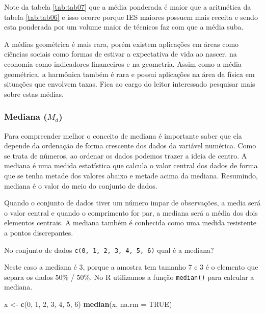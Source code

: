 \documentclass[12pt,]{style/krantz}
\makeatletter
\newenvironment{Shaded}{\begin{snugshade}}{\end{snugshade}}
\newcommand{\KeywordTok}[1]{\textcolor[rgb]{0.13,0.29,0.53}{\textbf{#1}}}
\newcommand{\DataTypeTok}[1]{\textcolor[rgb]{0.13,0.29,0.53}{#1}}
\newcommand{\DecValTok}[1]{\textcolor[rgb]{0.00,0.00,0.81}{#1}}
\newcommand{\StringTok}[1]{\textcolor[rgb]{0.31,0.60,0.02}{#1}}
\newcommand{\OtherTok}[1]{\textcolor[rgb]{0.56,0.35,0.01}{#1}}
\newcommand{\NormalTok}[1]{#1}
\renewenvironment{quote}{\begin{VF}}{\end{VF}}
\newenvironment{kframe}{%
\medskip{}
\setlength{\fboxsep}{.8em}
 \def\at@end@of@kframe{}%
 \ifinner\ifhmode%
  \def\at@end@of@kframe{\end{minipage}}%
  \begin{minipage}{\columnwidth}%
 \fi\fi%
 \def\FrameCommand##1{\hskip\@totalleftmargin \hskip-\fboxsep
 \colorbox{shadecolor}{##1}\hskip-\fboxsep
     \hskip-\linewidth \hskip-\@totalleftmargin \hskip\columnwidth}%
 \MakeFramed {\advance\hsize-\width
   \@totalleftmargin\z@ \linewidth\hsize
   \@setminipage}}%
 {\par\unskip\endMakeFramed%
 \at@end@of@kframe}
\renewenvironment{Shaded}{\begin{kframe}}{\end{kframe}}
\theoremstyle{definition}
\theoremstyle{definition}
\theoremstyle{definition}
\theoremstyle{remark}
\let\BeginKnitrBlock\begin \let\EndKnitrBlock\end
\makeatother
\begin{document}
Note da tabela \ref{tab:tab07} que a média ponderada é maior que a
aritmética da tabela \ref{tab:tab06} e isso ocorre porque IES maiores
possuem mais receita e sendo esta ponderada por um volume maior de
técnicos faz com que a média suba.

A médias geométrica é mais rara, porém existem aplicações em áreas como
ciências sociais como formas de estivar a expectativa de vida ao nascer,
na economia como indicadores financeiros e na geometria. Assim como a
média geométrica, a harmônica também é rara e possui aplicações na área
da física em situações que envolvem taxas. Fica ao cargo do leitor
interessado pesquisar mais sobre estas médias.

\subsubsection{\texorpdfstring{Mediana
(\(M_d\))}{Mediana (M\_d)}}\label{mediana-m_d}

Para compreender melhor o conceito de mediana é importante saber que ela
depende da ordenação de forma crescente dos dados da variável numérica.
Como se trata de números, ao ordenar os dados podemos trazer a ideia de
centro. A mediana é uma medida estatística que calcula o valor central
dos dados de forma que se tenha metade dos valores abaixo e metade acima
da mediana. Resumindo, mediana é o valor do meio do conjunto de dados.

\begin{quote}
Quando o conjunto de dados tiver um número impar de observações, a media
será o valor central e quando o comprimento for par, a mediana será a
média dos dois elementos centrais. A mediana também é conhecida como uma
medida resistente a pontos discrepantes.
\end{quote}

\BeginKnitrBlock{example}
\protect\hypertarget{exm:unnamed-chunk-52}{}{\label{exm:unnamed-chunk-52}
}No conjunto de dados \texttt{c(0,\ 1,\ 2,\ 3,\ 4,\ 5,\ 6)} qual é a
mediana?
\EndKnitrBlock{example}

Neste caso a mediana é 3, porque a amostra tem tamanho 7 e 3 é o
elemento que separa os dados 50\% / 50\%. No R utilizamos a função
\texttt{median()} para calcular a mediana.

\begin{Shaded}
\begin{Highlighting}[]
\NormalTok{x <-}\StringTok{ }\KeywordTok{c}\NormalTok{(}\DecValTok{0}\NormalTok{, }\DecValTok{1}\NormalTok{, }\DecValTok{2}\NormalTok{, }\DecValTok{3}\NormalTok{, }\DecValTok{4}\NormalTok{, }\DecValTok{5}\NormalTok{, }\DecValTok{6}\NormalTok{)}
\KeywordTok{median}\NormalTok{(x, }\DataTypeTok{na.rm =} \OtherTok{TRUE}\NormalTok{)}
\end{Highlighting}
\end{Shaded}
\end{document}
